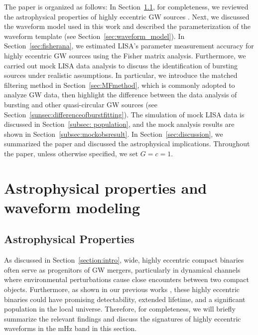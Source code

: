 \documentclass[%
 reprint,
 amsmath,amssymb,
 aps,
]{revtex4-2}
\begin{document}
The paper is organized as follows: In Section~\ref{sec:astro}, for completeness,
we reviewed the astrophysical properties of highly eccentric GW sources \citep{Xuan+23b, Xuan24bkg}. Next, we discussed the waveform model used in this work and 
described the parameterization of the waveform template (see Section~\ref{sec:waveform_model}). In Section~\ref{sec:fisherana}, we estimated LISA's parameter measurement accuracy for highly eccentric GW sources using the Fisher matrix analysis. Furthermore, we carried out mock LISA data analysis to 
discuss the identification of bursting sources under realistic assumptions. In particular, we introduce the matched filtering method in Section~\ref{sec:MFmethod}, which is commonly adopted to analyze GW data, then highlight the difference between the data analysis of bursting and other quasi-circular GW sources (see Section~\ref{sunsec:differenceofburstfitting}). The 
simulation of mock LISA data is discussed in Section~\ref{subsec: population}, and the mock analysis results are shown in Section~\ref{subsec:mockobsresult}. In Section~\ref{sec:discussion}, we summarized the paper and discussed the astrophysical implications. Throughout the paper, unless otherwise specified, we set $G=c=1$.


\section{Astrophysical properties and waveform modeling}
\subsection{Astrophysical Properties}\label{sec:astro}

As discussed in Section~\ref{section:intro}, wide, highly eccentric compact binaries often serve as progenitors of GW mergers, particularly in dynamical channels where environmental perturbations cause close encounters between two compact objects. Furthermore, as shown in our previous works \citep{Xuan+23b,Xuan24bkg}, these highly eccentric binaries could have promising detectability, extended lifetime, and a significant population in the local universe. Therefore, for completeness, we will briefly summarize the relevant findings and discuss the signatures of highly eccentric waveforms in the mHz band in this section.
\end{document}
